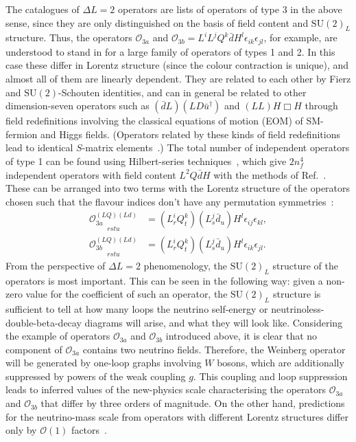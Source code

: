 The catalogues of $\Delta L = 2$ operators are lists of operators of type 3 in
the above sense, since they are only distinguished on the basis of field content
and $\mathrm{SU}(2)_{L}$ structure. Thus, the operators $\mathcal{O}_{3a}$ and
$\mathcal{O}_{3b} = L^{i}L^{j}Q^{k}\bar{d}H^{l} \epsilon_{ik}\epsilon_{jl}$, for
example, are understood to stand in for a large family of operators of types 1
and 2. In this case these differ in Lorentz structure (since the colour
contraction is unique), and almost all of them are linearly dependent. They are
related to each other by Fierz and $\mathrm{SU}(2)$-Schouten identities, and can
in general be related to other dimension-seven operators such as
$(\bar{d} L) (L D \bar{u}^{\dagger})$ and $(LL)H\Box H$ through field
redefinitions involving the classical equations of motion (EOM) of SM-fermion
and Higgs fields. (Operators related by these kinds of field redefinitions lead
to identical $S$-matrix elements~\cite{Arzt:1993gz}.) The total number of
independent operators of type 1 can be found using Hilbert-series
techniques~\cite{Lehman:2015via, Henning:2015daa, Lehman:2015coa,
  Henning:2015alf, Henning:2017fpj}, which give $2n_{f}^{4}$ independent
operators with field content $L^{2} Q \bar{d} H$ with the methods of
Ref.~\cite{Henning:2015alf}. These can be arranged into two terms with the
Lorentz structure of the operators chosen such that the flavour indices don't
have any permutation symmetries~\cite{Lehman:2014jma}:
\begin{subequations}
  \label{eq:o3a3b-complete}
  \begin{align}
    \underset{rstu}{\mathcal{O}_{3a}^{(LQ)(Ld)}} &= (L^{i}_{r}Q^{k}_{t})(L^{j}_{s}\bar{d}_{u})H^{l} \epsilon_{ij} \epsilon_{kl},\\
    \underset{rstu}{\mathcal{O}_{3b}^{(LQ)(Ld)}} &= (L^{i}_{r}Q^{k}_{t})(L^{j}_{s}\bar{d}_{u})H^{l} \epsilon_{ik} \epsilon_{jl}.
  \end{align}
\end{subequations}
From the perspective of $\Delta L = 2$ phenomenology, the $\mathrm{SU}(2)_L$
structure of the operators is most important. This can be seen in the following
way: given a non-zero value for the coefficient of such an operator, the
$\mathrm{SU}(2)_{L}$ structure is sufficient to tell at how many loops the
neutrino self-energy or neutrinoless-double-beta-decay diagrams will arise, and
what they will look like. Considering the example of operators
$\mathcal{O}_{3a}$ and $\mathcal{O}_{3b}$ introduced above, it is clear that no
component of $\mathcal{O}_{3a}$ contains two neutrino fields. Therefore, the
Weinberg operator will be generated by one-loop graphs involving $W$ bosons,
which are additionally suppressed by powers of the weak coupling $g$. This
coupling and loop suppression leads to inferred values of the new-physics scale
characterising the operators $\mathcal{O}_{3a}$ and $\mathcal{O}_{3b}$ that
differ by three orders of magnitude. On the other hand, predictions for the
neutrino-mass scale from operators with different Lorentz structures differ only
by $\mathcal{O}(1)$ factors~\cite{deGouvea:2007qla}.

